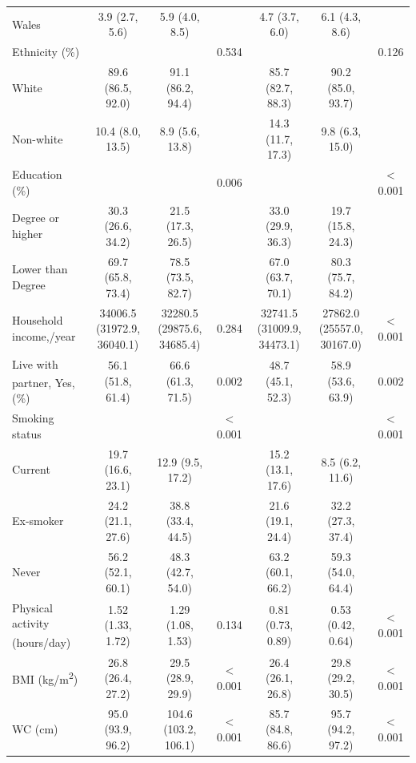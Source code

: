 \begin{table}
\begin{tabular}[t]{lcccccc}
		\hspace{1em}Wales & 3.9 (2.7, 5.6) & 5.9 (4.0, 8.5) &  & 4.7 (3.7, 6.0) & 6.1 (4.3, 8.6) & \\
		Ethnicity (\%) &  &  & 0.534 &  &  & 0.126\\
		\hspace{1em}White & 89.6 (86.5, 92.0) & 91.1 (86.2, 94.4) &  & 85.7 (82.7, 88.3) & 90.2 (85.0, 93.7) & \\
		\hspace{1em}Non-white & 10.4 (8.0, 13.5) & 8.9 (5.6, 13.8) &  & 14.3 (11.7, 17.3) & 9.8 (6.3, 15.0) & \\
		Education (\%) &  &  & 0.006 &  &  & < 0.001\\
		\hspace{1em}Degree or higher & 30.3 (26.6, 34.2) & 21.5 (17.3, 26.5) &  & 33.0 (29.9, 36.3) & 19.7 (15.8, 24.3) & \\
		\hspace{1em}Lower than Degree & 69.7 (65.8, 73.4) & 78.5 (73.5, 82.7) &  & 67.0 (63.7, 70.1) & 80.3 (75.7, 84.2) & \\
		Household income,\textsterling/year & 34006.5 (31972.9, 36040.1) & 32280.5 (29875.6, 34685.4) & 0.284 &  32741.5 (31009.9, 34473.1) & 27862.0 (25557.0, 30167.0)  &  < 0.001  \\
		Live with partner\textsuperscript{\ddag}, Yes, (\%) & 56.1 (51.8, 61.4) & 66.6 (61.3, 71.5) & 0.002   & 48.7 (45.1, 52.3) & 58.9 (53.6, 63.9)  & 0.002    \\
		Smoking status &  &  & < 0.001 &  &  & < 0.001\\
		\hspace{1em}Current & 19.7 (16.6, 23.1) & 12.9 (9.5, 17.2) &  & 15.2 (13.1, 17.6) & 8.5 (6.2, 11.6) & \\
		\hspace{1em}Ex-smoker & 24.2 (21.1, 27.6) & 38.8 (33.4, 44.5) &  & 21.6 (19.1, 24.4) & 32.2 (27.3, 37.4) & \\
		\hspace{1em}Never & 56.2 (52.1, 60.1) & 48.3 (42.7, 54.0) &  & 63.2 (60.1, 66.2) & 59.3 (54.0, 64.4) & \\
		Physical
		activity (hours/day) \textsuperscript{\dag} & 1.52 (1.33, 1.72) & 1.29 (1.08, 1.53) & 0.134 & 0.81 (0.73, 0.89) & 0.53 (0.42, 0.64) & < 0.001\\
		BMI (kg/m\textsuperscript{2}) & 26.8 (26.4, 27.2) & 29.5 (28.9, 29.9) & < 0.001 & 26.4 (26.1, 26.8) & 29.8 (29.2, 30.5) & < 0.001\\
		WC (cm) & 95.0 (93.9, 96.2) & 104.6 (103.2, 106.1) & < 0.001 & 85.7 (84.8, 86.6) & 95.7 (94.2, 97.2) & < 0.001\\

\end{tabular}
\end{table}
